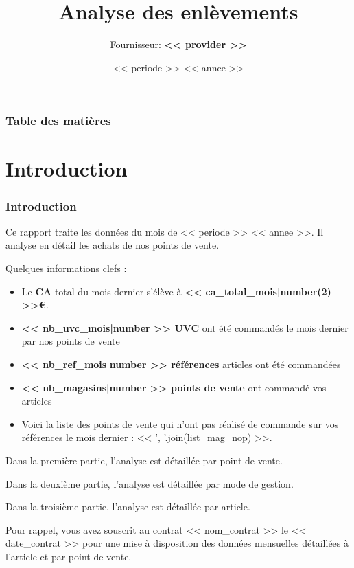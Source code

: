\documentclass{beamer}
\title{Analyse des enlèvements}
\author{Fournisseur: \textbf{<< provider >>}}
\date{<< periode >> << annee >>}
\begin{document}
    \begin{frame}
        \titlepage
    \end{frame}

    \begin{frame}
        \frametitle{Table des matières}
        \tableofcontents
    \end{frame}

    \section{Introduction}

    \begin{frame}
        \tiny
        \frametitle{Introduction}
        Ce rapport traite les données du mois de << periode >> << annee >>. Il analyse en détail les achats de nos points de vente.\par

        Quelques informations clefs :

        \begin{itemize}
            \item{Le \textbf{CA} total du mois dernier s’élève à \textbf{<< ca_total_mois|number(2) >>€}.}
            \item{\textbf{<< nb_uvc_mois|number >> UVC} ont été commandés le mois dernier par nos points de vente}
            \item{\textbf{<< nb_ref_mois|number >> références} articles ont été commandées}
            \item{\textbf{<< nb_magasins|number >> points de vente} ont commandé vos articles}
            \item{Voici la liste des points de vente qui n’ont pas réalisé de commande sur vos références le mois dernier : << ', '.join(list_mag_nop) >>.}
        \end{itemize}

        Dans la première partie, l’analyse est détaillée par point de vente.\par
        Dans la deuxième partie, l’analyse est détaillée par mode de gestion.\par
        Dans la troisième partie, l’analyse est détaillée par article.\par
        Pour rappel, vous avez souscrit au contrat << nom_contrat >> le << date_contrat >> pour une mise à disposition des données mensuelles détaillées à l’article et par point de vente.\par
    \end{frame}
\end{document}
